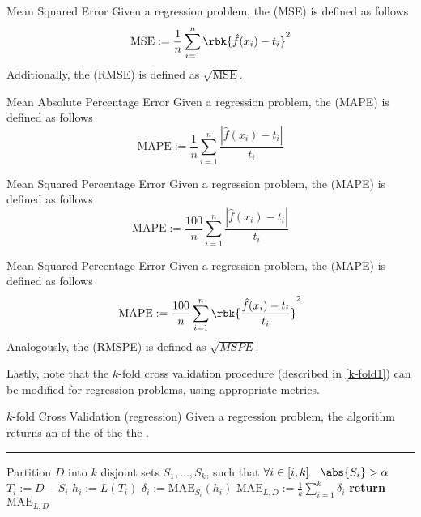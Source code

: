 \documentclass[a4paper, 12pt]{report}
\begin{document}
    \begin{frameddefn}{Mean Squared Error}
        Given a regression problem, the  (MSE) is defined as follows $$\mathrm{MSE} := \dfrac{1}{n} \sum_{i = 1}^n {\rbk{\hat f(x_i) - t_i}^2}$$ Additionally, the  (RMSE) is defined as $\sqrt{\mathrm{MSE}}$.
    \end{frameddefn}

    \begin{frameddefn}{Mean Absolute Percentage Error}
        Given a regression problem, the  (MAPE) is defined as follows $$\mathrm{MAPE} := \dfrac{1}{n} \sum_{i = 1}^n{\dfrac{|\hat f(x_i) - t_i|}{t_i}}$$
    \end{frameddefn}

    \begin{frameddefn}{Mean Squared Percentage Error}
        Given a regression problem, the  (MAPE) is defined as follows $$\mathrm{MAPE} := \dfrac{100}{n} \sum_{i = 1}^n{\dfrac{|\hat f(x_i) - t_i|}{t_i}}$$
    \end{frameddefn}

    \begin{frameddefn}{Mean Squared Percentage Error}
        Given a regression problem, the  (MAPE) is defined as follows $$\mathrm{MAPE} := \dfrac{100}{n} \sum_{i = 1}^n{\rbk{\dfrac{\hat f(x_i) - t_i}{t_i}}^2}$$ Analogously, the  (RMSPE) is defined as $\sqrt{MSPE}$.
    \end{frameddefn}

    Lastly, note that the $k$-fold cross validation procedure (described in \cref{k-fold1}) can be modified for regression problems, using appropriate metrics.

    \begin{framedalgo}[label={k-fold3}]{$k$-fold Cross Validation (regression)}
        Given a regression problem, the algorithm returns an  of the  of the the . \\
        \hrule
        \quad
        \begin{algorithmic}[1]
                \State Partition $D$ into $k$ disjoint sets $S_1, \ldots , S_k$, such that $\forall i \in [i, k] \quad \abs{S_i} > \alpha$
                    \State $T_i := D - S_i$ 
                    \State $h_i := L(T_i)$
                    \State $\delta_i := \mathrm{MAE}_{S_i}(h_i)$
                \EndFor
                \State $\mathrm{MAE}_{L, D} := \frac{1}{k} \sum_{i = 1}^k{\delta_i}$
                \State \textbf{return} $\mathrm{MAE}_{L, D}$
            \EndFunction
        \end{algorithmic}
    \end{framedalgo}
\end{document}
